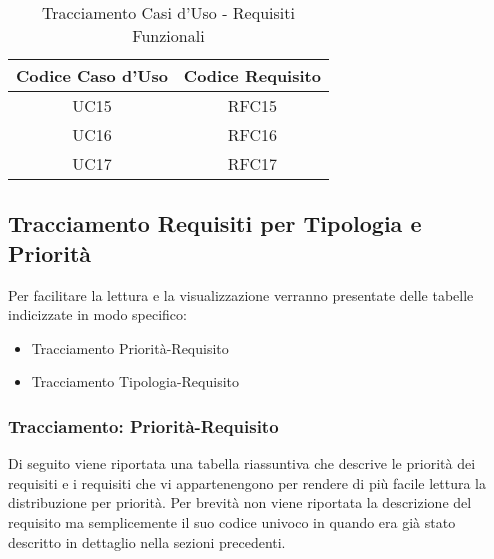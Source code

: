        \begin{table}[!htbp] %
            \centering
            \renewcommand{\arraystretch}{2} %
                \begin{tabular}{|c|c|} %
                \rowcolor{orange!50} %
                \hline
        		\textbf{Codice Caso d'Uso} & \textbf{Codice Requisito} \\
        		\hline
                UC15 & RFC15\\
                \hline
                UC16 & RFC16\\
                \hline
                UC17 & RFC17\\
                \hline
        \end{tabular}
        \caption{Tracciamento Casi d'Uso - Requisiti Funzionali} %
\end{table}

\subsection{Tracciamento Requisiti per Tipologia e Priorità}
Per facilitare la lettura e la visualizzazione verranno presentate delle tabelle indicizzate in modo specifico:
\begin{itemize}
    \item Tracciamento Priorità-Requisito
    \item Tracciamento Tipologia-Requisito
\end{itemize}

\newpage
\subsubsection{Tracciamento: Priorità-Requisito}
Di seguito viene riportata una tabella riassuntiva che descrive le priorità dei requisiti e i requisiti che vi appartenengono per rendere di più facile lettura la distribuzione per priorità.
Per brevità non viene riportata la descrizione del requisito ma semplicemente il suo codice univoco in quando era già stato descritto in dettaglio nella sezioni precedenti.   

